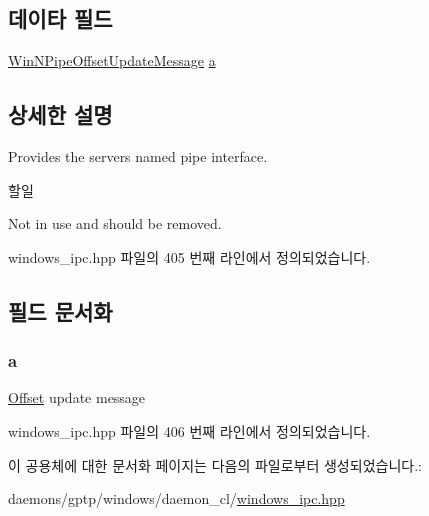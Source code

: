 \subsection*{데이타 필드}
\begin{DoxyCompactItemize}
\item 
\hyperlink{class_win_n_pipe_offset_update_message}{Win\+N\+Pipe\+Offset\+Update\+Message} \hyperlink{union_windows_n_pipe_msg_server_a25299f0cd0ecafabb529a4ce2b38c508}{a}
\end{DoxyCompactItemize}


\subsection{상세한 설명}
Provides the server\textquotesingle{}s named pipe interface. 

\begin{DoxyRefDesc}{할일}
\item[\hyperlink{todo__todo000028}{할일}]Not in use and should be removed. \end{DoxyRefDesc}


windows\+\_\+ipc.\+hpp 파일의 405 번째 라인에서 정의되었습니다.



\subsection{필드 문서화}
\subsubsection[{\texorpdfstring{a}{a}}]{ a}\hypertarget{union_windows_n_pipe_msg_server_a25299f0cd0ecafabb529a4ce2b38c508}{}\label{union_windows_n_pipe_msg_server_a25299f0cd0ecafabb529a4ce2b38c508}
\hyperlink{class_offset}{Offset} update message 

windows\+\_\+ipc.\+hpp 파일의 406 번째 라인에서 정의되었습니다.



이 공용체에 대한 문서화 페이지는 다음의 파일로부터 생성되었습니다.\+:\begin{DoxyCompactItemize}
\item 
daemons/gptp/windows/daemon\+\_\+cl/\hyperlink{windows__ipc_8hpp}{windows\+\_\+ipc.\+hpp}\end{DoxyCompactItemize}
